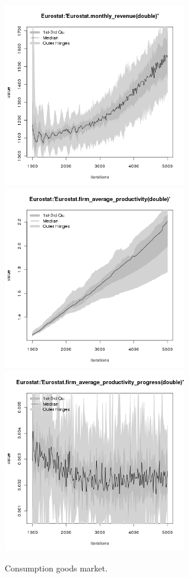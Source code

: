 \begin{figure}[H!]
\begin{minipage}{17cm}
\includegraphics[width=8cm]{./png/tax_0.10/Eurostat-monthly_revenue.png}\\
\includegraphics[width=8cm]{./png/tax_0.10/Eurostat-firm_average_productivity.png}
\includegraphics[width=8cm]{./png/tax_0.10/Eurostat-firm_average_productivity_progress.png}
\end{minipage}
\caption{Consumption goods market.}
\label{Figure: Consumption Market}
\end{figure}
\clearpage


